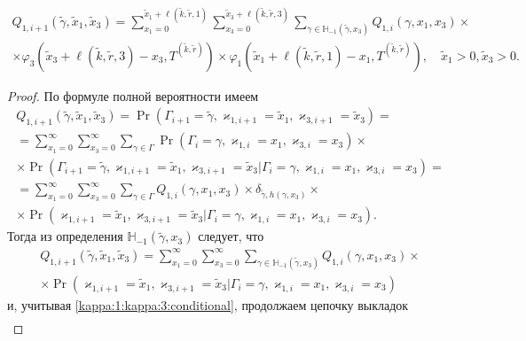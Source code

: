 \begin{theorem}
\begin{multline*}
\end{multline*}
\begin{multline*}
Q_{1, i+1}(\tilde{\gamma}, \tilde{x}_1,  \tilde{x}_3)= 
\sum_{x_1=0}^{\tilde{x}_1 +\ell(\tilde{k}, \tilde{r}, 1)} \sum_{x_3=0}^{\tilde{x}_3 +\ell(\tilde{k}, \tilde{r}, 3)} \sum_{\gamma \in {\mathbb H}_{-1}(\tilde{\gamma}, x_3)}Q_{1, i}(\gamma, x_1,  x_3) \times  \\ \times \varphi_3(\tilde{x}_3 + \ell(\tilde{k}, \tilde{r}, 3) - x_3, T^{(\tilde{k}, \tilde{r})})  \times \varphi_1(\tilde{x}_1 + \ell(\tilde{k}, \tilde{r}, 1)-x_1, T^{(\tilde{k}, \tilde{r})}),  \quad \tilde{x}_1 > 0,  \tilde{x}_3 > 0.
\end{multline*}
\label{prob:rek:1}
\end{theorem}
\begin{proof}
По формуле полной вероятности имеем
\begin{multline*}
Q_{1, i+1}(\tilde{\gamma}, \tilde{x}_1, \tilde{x}_3) = \Pr(\Gamma_{i+1}=\tilde{\gamma},  \varkappa_{1, i+1}=\tilde{x}_1,  \varkappa_{3, i+1}=\tilde{x}_3) = \\
= \sum_{x_1=0}^{\infty}\sum_{x_3=0}^{\infty}\sum_{\gamma \in \Gamma} \Pr(\Gamma_{i}=\gamma,  \varkappa_{1, i}=x_1,  \varkappa_{3, i}=x_3) \times \\ \times  \Pr(\Gamma_{i+1}=\tilde{\gamma},  \varkappa_{1, i+1}=\tilde{x}_1,  \varkappa_{3, i+1}=\tilde{x}_3 | \Gamma_{i}=\gamma, \varkappa_{1, i}=x_1,  \varkappa_{3, i}=x_3) =  \\ 
=\sum_{x_1=0}^{\infty} \sum_{x_3=0}^{\infty}\sum_{\gamma \in \Gamma} Q_{1, i}(\gamma,  x_1,  x_3) \times \delta_{\tilde{\gamma}, h(\gamma, x_3)}\times \\ \times
\Pr(\varkappa_{1, i+1}=\tilde{x}_1 ,  \varkappa_{3, i+1}=\tilde{x}_3 | \Gamma_{i}=\gamma,  \varkappa_{1, i}=x_1,  \varkappa_{3, i}=x_3).
\end{multline*}
Тогда из определения $ {\mathbb H}_{-1}(\tilde{\gamma}, x_3)$ следует,  что 
\begin{multline*}
Q_{1, i+1}(\tilde{\gamma}, \tilde{x}_1,  \tilde{x}_3) =\sum_{x_1=0}^{\infty} \sum_{x_3=0}^{\infty}\sum_{\gamma \in {\mathbb H}_{-1}(\tilde{\gamma}, x_3)} Q_{1, i}(\gamma, x_1,  x_3) \times \\ \times 
\Pr(\varkappa_{1, i+1}=\tilde{x}_1,  \varkappa_{3, i+1}=\tilde{x}_3 | \Gamma_{i}=\gamma,  \varkappa_{1, i}=x_1,  \varkappa_{3, i}=x_3)
\end{multline*}
и, учитывая \eqref{kappa:1:kappa:3:conditional}, продолжаем цепочку выкладок
\begin{multline*}

\end{multline*}
\end{proof}
